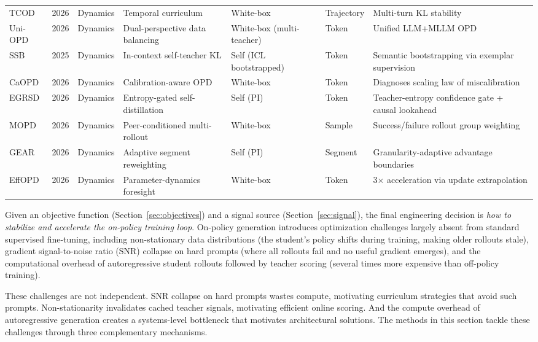 \documentclass{article} %
\begin{document}
\begin{table}[t]
{\begin{tabular}{@{}lclllll@{}}
        TCOD \citep{2604.24005} & 2026 & Dynamics & Temporal curriculum & White-box & Trajectory & Multi-turn KL stability \\
        Uni-OPD \citep{2605.03677} & 2026 & Dynamics & Dual-perspective data balancing & White-box (multi-teacher) & Token & Unified LLM+MLLM OPD \\
        SSB \citep{2512.05105} & 2025 & Dynamics & In-context self-teacher KL & Self (ICL bootstrapped) & Token & Semantic bootstrapping via exemplar supervision \\
        CaOPD \citep{2604.16830} & 2026 & Dynamics & Calibration-aware OPD & White-box & Token & Diagnoses scaling law of miscalibration \\
        EGRSD \citep{2605.13255} & 2026 & Dynamics & Entropy-gated self-distillation & Self (PI) & Token & Teacher-entropy confidence gate + causal lookahead \\
        MOPD \citep{2605.12652} & 2026 & Dynamics & Peer-conditioned multi-rollout & White-box & Sample & Success/failure rollout group weighting \\
        GEAR \citep{2605.11853} & 2026 & Dynamics & Adaptive segment reweighting & Self (PI) & Segment & Granularity-adaptive advantage boundaries \\
        EffOPD \citep{2605.11739} & 2026 & Dynamics & Parameter-dynamics foresight & White-box & Token & 3$\times$ acceleration via update extrapolation \\
        \bottomrule
    \end{tabular}
    }
\end{table}

Given an objective function (Section~\ref{sec:objectives}) and a signal source (Section~\ref{sec:signal}), the final engineering decision is \emph{how to stabilize and accelerate the on-policy training loop}. On-policy generation introduces optimization challenges largely absent from standard supervised fine-tuning, including non-stationary data distributions (the student's policy shifts during training, making older rollouts stale), gradient signal-to-noise ratio (SNR) collapse on hard prompts (where all rollouts fail and no useful gradient emerges), and the computational overhead of autoregressive student rollouts followed by teacher scoring (several times more expensive than off-policy training).

These challenges are not independent. SNR collapse on hard prompts wastes compute, motivating curriculum strategies that avoid such prompts. Non-stationarity invalidates cached teacher signals, motivating efficient online scoring. And the compute overhead of autoregressive generation creates a systems-level bottleneck that motivates architectural solutions. The methods in this section tackle these challenges through three complementary mechanisms.
\end{document}
